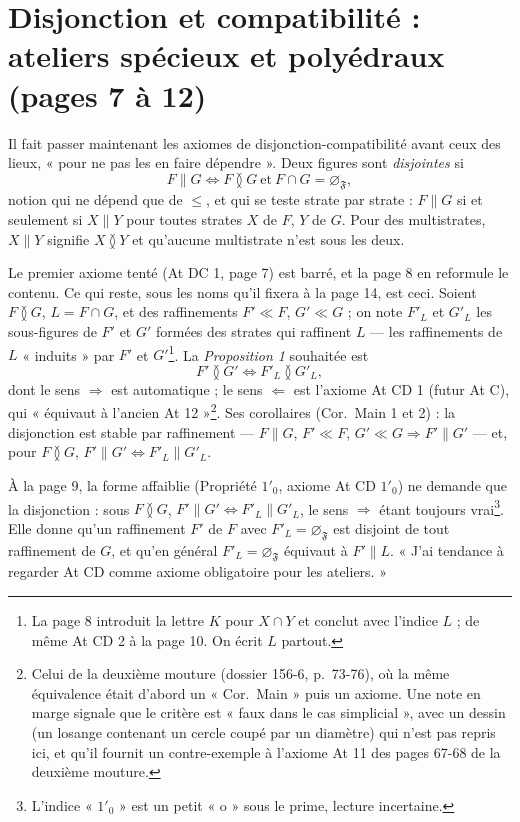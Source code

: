 \documentclass[11pt,a4paper]{article}
\begin{document}
\section*{Disjonction et compatibilité : ateliers spécieux et polyédraux (pages 7 à 12)}

Il fait passer maintenant les axiomes de disjonction-compatibilité avant ceux
des lieux, « pour ne pas les en faire dépendre ». Deux figures sont
\emph{disjointes} si
\[
F \parallel G \iff F \between G \ \text{et}\ F \cap G = \varnothing_{\mathfrak{F}} ,
\]
notion qui ne dépend que de $\leq$, et qui se teste strate par strate : $F
\parallel G$ si et seulement si $X \parallel Y$ pour toutes strates $X$ de $F$,
$Y$ de $G$. Pour des multistrates, $X \parallel Y$ signifie $X \between Y$ et
qu'aucune multistrate n'est sous les deux.

Le premier axiome tenté (At DC 1, page 7) est barré, et la page 8 en
reformule le contenu. Ce qui reste, sous les noms qu'il fixera à la page 14, est
ceci. Soient $F \between G$, $L = F \cap G$, et des raffinements $F' \ll F$, $G'
\ll G$ ; on note $F'_{L}$ et $G'_{L}$ les sous-figures de $F'$ et $G'$ formées des
strates qui raffinent $L$ --- les raffinements de $L$ « induits » par $F'$ et
$G'$\footnote{La page 8 introduit la lettre $K$ pour $X \cap Y$ et conclut avec
l'indice $L$ ; de même At CD 2 à la page 10. On écrit $L$ partout.}. La
\emph{Proposition 1} souhaitée est
\[
F' \between G' \iff F'_{L} \between G'_{L} ,
\]
dont le sens $\Rightarrow$ est automatique ; le sens $\Leftarrow$ est l'axiome
At CD 1 (futur At C), qui « équivaut à l'ancien At 12 »\footnote{Celui de la
deuxième mouture (dossier 156-6, p.~73-76), où la même équivalence était d'abord
un « Cor.\ Main » puis un axiome. Une note en marge signale que le critère est
« faux dans le cas simplicial », avec un dessin (un losange contenant un cercle
coupé par un diamètre) qui n'est pas repris ici, et qu'il fournit un
contre-exemple à l'axiome At 11 des pages 67-68 de la deuxième mouture.}. Ses
corollaires (Cor.\ Main 1 et 2) : la disjonction est stable par raffinement --- $F
\parallel G$, $F' \ll F$, $G' \ll G \Rightarrow F' \parallel G'$ --- et, pour $F
\between G$, $F' \parallel G' \iff F'_{L} \parallel G'_{L}$.

À la page 9, la forme affaiblie (Propriété $1'_{0}$, axiome At CD $1'_{0}$) ne
demande que la disjonction : sous $F \between G$, $F' \parallel G' \iff F'_{L}
\parallel G'_{L}$, le sens $\Rightarrow$ étant toujours vrai\footnote{L'indice
« $1'_{0}$ » est un petit « o » sous le prime, lecture incertaine.}. Elle donne
qu'un raffinement $F'$ de $F$ avec $F'_{L} = \varnothing_{\mathfrak{F}}$ est
disjoint de tout raffinement de $G$, et qu'en général $F'_{L} =
\varnothing_{\mathfrak{F}}$ équivaut à $F' \parallel L$. « J'ai tendance à
regarder At CD comme axiome obligatoire pour les ateliers. »
\end{document}
